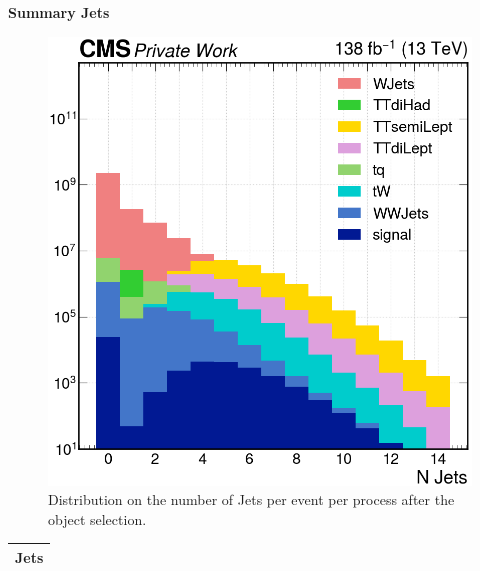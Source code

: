\begin{center}
    \vspace{1.5cm}
    \fontsize{14}{14}\selectfont
    \textbf{Summary Jets}
\end{center}

\begin{minipage}{\linewidth}
\begin{minipage}{0.53\linewidth}
      \begin{figure}[H]
            \centering
            \includegraphics[width=1\linewidth]{fig//chap07-selection/nJet.png}
            \caption{Distribution on the number of Jets per event per process after the object selection.}
            \label{fig:n_jet}
        \end{figure}
\end{minipage}
\hfill
\begin{minipage}{0.46\linewidth}
\vspace{-1.25cm}
\begin{table}[H]
    \centering
    \begin{tabular}{c|c}
        \toprule
        \multicolumn{2}{c}{\textbf{Jets}}\\
        \midrule
        \midrule
        

\end{tabular}
\end{table}
\end{minipage}
\end{minipage}
